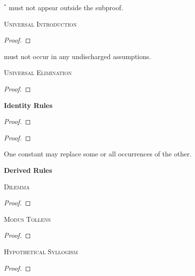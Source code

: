 $^\ast$  must not appear outside the subproof.

\textsc{Universal Introduction}

\begin{proof}
	 
\end{proof}

 must not occur in any undischarged assumptions.


\textsc{Universal Elimination}

\begin{proof}
	 
\end{proof}




{\Large \bf Identity Rules}

\begin{proof}
	 
\end{proof}

\begin{proof}
	 
	 
\end{proof}

One constant may replace some or all occurrences of the other.





\newpage

{\Large \bf Derived Rules}

\textsc{Dilemma}

\begin{proof}
	 
\end{proof}

\textsc{Modus Tollens}

\begin{proof}
	 
\end{proof}

\textsc{Hypothetical Syllogism}

\begin{proof}
\end{proof}



